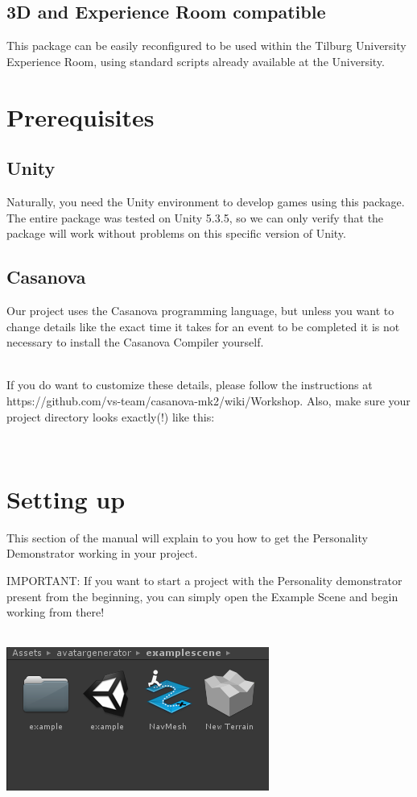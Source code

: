 \documentclass[11pt]{article} %
\begin{document}
\subsection{3D and Experience Room compatible}
This package can be easily reconfigured to be used within the Tilburg University Experience Room, using standard scripts already available at the University.

\newpage
\section{Prerequisites}
\subsection{Unity}
Naturally, you need the Unity environment to develop games using this package. The entire package was tested on Unity 5.3.5, so we can only verify that the package will work without problems on this specific version of Unity.

\subsection{Casanova}
Our project uses the Casanova programming language, but unless you want to change details like the exact time it takes for an event to be completed it is not necessary to install the Casanova Compiler yourself.

~\\
If you do want to customize these details, please follow the instructions at https://github.com/vs-team/casanova-mk2/wiki/Workshop. Also, make sure your project directory looks exactly(!) like this: 

~\\


\newpage
\section{Setting up}
This section of the manual will explain to you how to get the Personality Demonstrator working in your project. 

IMPORTANT: If you want to start a project with the Personality demonstrator present from the beginning, you can simply open the Example Scene and begin working from there! 

~\\
\includegraphics{0}
~\\ 
\end{document}

